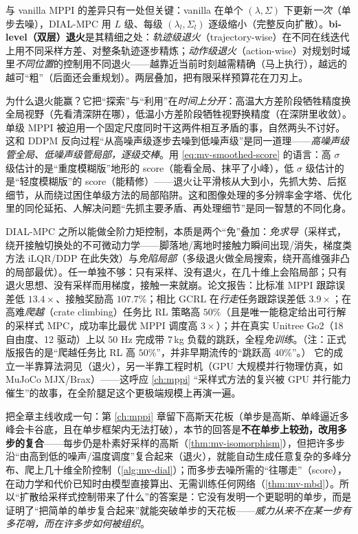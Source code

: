 \noindent 与 vanilla MPPI 的差异只有一处但关键：vanilla 在单个 $(\lambda,\Sigma)$ 下更新\emph{一次}（单步去噪），DIAL-MPC 用 $L$ 级、每级 $(\lambda_l,\Sigma_l)$ 逐级缩小（完整反向扩散）。\textbf{bi-level（双层）退火}是其精细之处：\emph{轨迹级退火}（trajectory-wise）在不同在线迭代上用不同采样方差、对整条轨迹逐步精炼；\emph{动作级退火}（action-wise）对规划时域里\emph{不同位置}的控制用不同退火——越靠近当前时刻越需精确（马上执行），越远的越可“粗”（后面还会重规划）。两层叠加，把有限采样预算花在刀刃上。

\begin{insight}
为什么退火能赢？它把“探索”与“利用”在\emph{时间上分开}：高温大方差阶段牺牲精度换全局视野（先看清深阱在哪），低温小方差阶段牺牲视野换精度（在深阱里收敛）。单级 MPPI 被迫用一个固定尺度同时干这两件相互矛盾的事，自然两头不讨好。这和 DDPM 反向过程“从高噪声级逐步去噪到低噪声级”是同一道理——\emph{高噪声级管全局、低噪声级管局部，逐级交棒}。用 \cref{eq:mv-smoothed-score} 的语言：高 $\sigma$ 级估计的是“重度模糊版”地形的 score（能看全局、抹平了小峰），低 $\sigma$ 级估计的是“轻度模糊版”的 score（能精修）——退火让平滑核从大到小，先抓大势、后抠细节，从而绕过困住单级方法的局部陷阱。这和图像处理的多分辨率金字塔、优化里的同伦延拓、人解决问题“先抓主要矛盾、再处理细节”是同一智慧的不同化身。
\end{insight}

\noindent DIAL-MPC 之所以能做全阶力矩控制，本质是两个“免”叠加：\emph{免求导}（采样式，绕开接触切换处的不可微动力学——脚落地/离地时接触力瞬间出现/消失，梯度类方法 iLQR/DDP 在此失效）与\emph{免陷局部}（多级退火做全局搜索，绕开高维强非凸的局部最优）。任一单独不够：只有采样、没有退火，在几十维上会陷局部；只有退火思想、没有采样而用梯度，接触一来就崩。论文报告：比标准 MPPI 跟踪误差低 $13.4\times$、接触奖励高 $107.7\%$；相比 GCRL 在\emph{行走}任务跟踪误差低 $3.9\times$；在高难\emph{爬越}（crate climbing）任务比 RL 策略高 $50\%$（且是唯一能稳定给出可行解的采样式 MPC，成功率比最优 MPPI 调度高 $3\times$）；并在真实 Unitree Go2（18 自由度、12 驱动）上以 $50$ Hz 完成带 $7$\,kg 负载的跳跃，全程\emph{免训练}\cite{xue2025dial}。（注：正式版报告的是“爬越任务比 RL 高 $50\%$”，并非早期流传的“跳跃高 $40\%$”。） 它的成立一半靠算法洞见（退火），另一半靠工程时机（GPU 大规模并行物理仿真，如 MuJoCo MJX/Brax）——这呼应 \cref{ch:mppi} “采样式方法的复兴被 GPU 并行能力催生”的故事，在全阶腿足这个更极端规模上再演一遍。

\begin{insight}
把全章主线收成一句：第 \cref{ch:mppi} 章留下高斯天花板（单步是高斯、单峰逼近多峰会卡谷底，且在单步框架内无法打破），本节的回答是\textbf{不在单步上较劲，改用多步的复合}——每步仍是朴素好采样的高斯（\cref{thm:mv-isomorphism}），但把许多步沿“由高到低的噪声/温度调度”复合起来（退火），就能自动生成任意复杂的多峰分布、爬上几十维全阶控制（\cref{alg:mv-dial}）；而多步去噪所需的“往哪走”（score），在动力学和代价已知时由模型直接算出、无需训练任何网络（\cref{thm:mv-mbd}）。所以“扩散给采样式控制带来了什么”的答案是：它没有发明一个更聪明的单步，而是证明了“把简单的单步复合起来”就能突破单步的天花板——\emph{威力从来不在某一步有多花哨，而在许多步如何被组织}。
\end{insight}

